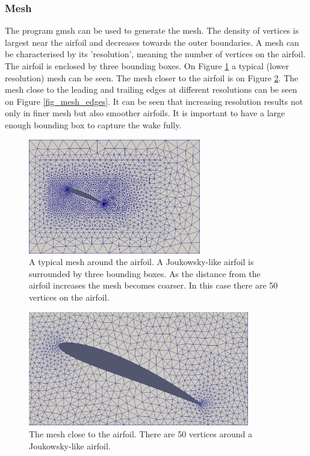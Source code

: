 \documentclass[12pt, a4paper]{article}
\begin{document}
\subsubsection{Mesh}
The program gmsh can be used to generate the mesh. The density of vertices is largest near the airfoil and decreases towards the outer boundaries. A mesh can be characterised by its 'resolution', meaning the number of vertices on the airfoil. The airfoil is enclosed by three bounding boxes. On Figure \ref{fig_mesh_full} a typical (lower resolution) mesh can be seen. The mesh closer to the airfoil is on Figure \ref{fig_mesh_close}. The mesh close to the leading and trailing edges at different resolutions can be seen on Figure \ref{fig_mesh_edges}. It can be seen that increasing resolution results not only in finer mesh but also smoother airfoils. It is important to have a large enough bounding box to capture the wake fully.
\begin{figure}[htbp]
    \centering
    \includegraphics[height=5cm]{mesh_1}
    \caption{A typical mesh around the airfoil. A Joukowsky-like airfoil is surrounded by three bounding boxes. As the distance from the airfoil increases the mesh becomes coarser. In this case there are 50 vertices on the airfoil.}
    \label{fig_mesh_full}
\end{figure}
\begin{figure}[htbp]
    \centering
    \includegraphics[height=5cm]{mesh_2}
    \caption{The mesh close to the airfoil. There are 50 vertices around a Joukowsky-like airfoil.}
    \label{fig_mesh_close}
\end{figure}
\end{document}
